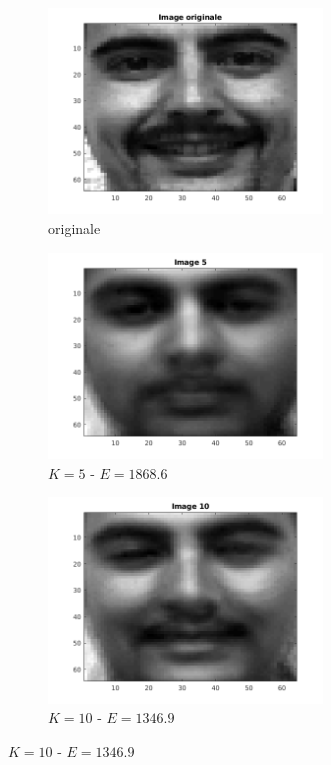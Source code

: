 \documentclass[a4paper]{article}
\begin{document}
\begin{figure}[H]
    \centering
     
    \begin{subfigure}[c]{0.3\textwidth}
        \centering
        \includegraphics[width=0.8\textwidth]{images/ex3_50_originale.png}
        \caption{originale}
        \label{subfig:ex3_50_originale}
    \end{subfigure}
    \begin{subfigure}[c]{0.3\textwidth}
        \centering
        \includegraphics[width=0.8\textwidth]{images/ex3_50_5.png}
        \caption{$K=5$ - $E = 1868.6$}
        \label{subfig:ex3_50_5}
    \end{subfigure}
    \begin{subfigure}[c]{0.3\textwidth}
        \centering
        \includegraphics[width=0.8\textwidth]{images/ex3_50_10.png}
        \caption{$K=10$ - $E = 1346.9$}
        \label{subfig:ex3_50_10}
    \end{subfigure}


\end{figure}
\end{document}
